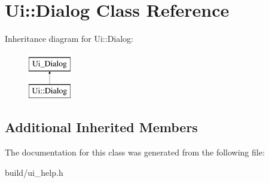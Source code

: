 \hypertarget{class_ui_1_1_dialog}{}\section{Ui\+:\+:Dialog Class Reference}
\label{class_ui_1_1_dialog}
Inheritance diagram for Ui\+:\+:Dialog\+:\begin{figure}[H]
\begin{center}
\leavevmode
\includegraphics[height=2.000000cm]{class_ui_1_1_dialog}
\end{center}
\end{figure}
\subsection*{Additional Inherited Members}


The documentation for this class was generated from the following file\+:\begin{DoxyCompactItemize}
\item 
build/ui\+\_\+help.\+h\end{DoxyCompactItemize}
